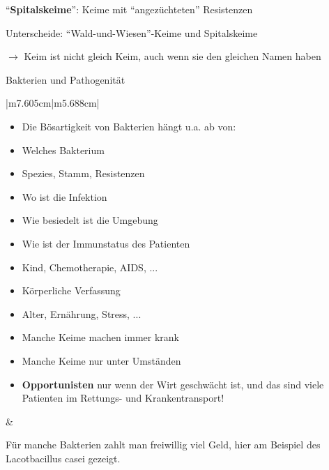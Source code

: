 \documentclass{article}
\newcommand\gEs[1]{\textbf{\textcolor[rgb]{0.0,0.0,0.5019608}{#1}}}
\newcommand\gEs[1]{\textbf{\textcolor[rgb]{0.0,0.0,0.5019608}{#1}}}
\newcommand\gT[1]{\textbf{\textup{\textcolor[rgb]{0.0,0.5019608,0.0}{#1}}}}
\begin{document}
{\mdseries
{\textquotedblleft}\gT{Spitalskeime}{\textquotedblright}:
Keime mit {\textquotedblleft}angez\"uchteten{\textquotedblright}
Resistenzen}

{\mdseries
Unterscheide:
{\textquotedblleft}Wald-und-Wiesen{\textquotedblright}-Keime und
Spitalskeime }

{\mdseries
${\rightarrow}$ Keim ist nicht gleich Keim, auch wenn sie den gleichen
Namen haben}

{\mdseries\color{black}
Bakterien und Pathogenit\"at}

\begin{flushleft}
\tablehead{}\begin{supertabular}{|m{7.605cm}|m{5.688cm}|}
\hline
\begin{itemize}
\item {\mdseries Die B\"osartigkeit von Bakterien h\"angt u.a. ab von:}

\end{itemize}
\begin{itemize}
\item {\mdseries Welches Bakterium}

\item {\mdseries Spezies, Stamm, Resistenzen}

\item {\mdseries Wo ist die Infektion}

\item {\mdseries Wie besiedelt ist die Umgebung}

\item {\mdseries Wie ist der Immunstatus des Patienten}

\item {\mdseries Kind, Chemotherapie, AIDS, ...}

\item {\mdseries K\"orperliche Verfassung}

\item {\mdseries Alter, Ern\"ahrung, Stress, ...}

\end{itemize}
\begin{itemize}
\item {\mdseries Manche Keime machen immer krank}

\item {\mdseries Manche Keime nur unter Umst\"anden}

\item {\mdseries \gEs{Opportunisten} nur wenn der
Wirt geschw\"acht ist, und das sind viele Patienten im Rettungs- und
Krankentransport!}

\end{itemize}
 &
{%
 \par}

\centering F\"ur manche Bakterien zahlt man freiwillig viel Geld, hier
am Beispiel des Lacotbacillus casei gezeigt. \par

\\\hline
\end{supertabular}
\end{flushleft}
\end{document}
